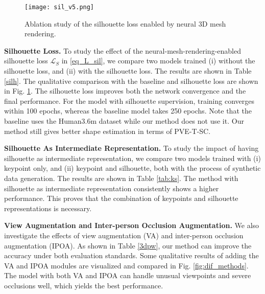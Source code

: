 \documentclass[journal]{IEEEtran}
\begin{document}
\begin{figure}[htbp]
    \centerline{\texttt{[image: sil\_v5.png]}}
    \caption{Ablation study of the silhouette loss enabled by neural 3D mesh rendering.}
    \label{fig:sil}
\end{figure}

\noindent\textbf{Silhouette Loss.} To study the effect of the neural-mesh-rendering-enabled silhouette loss $\mathcal{L}_{S}$ in {\eqref{eq_L_sil}}, we compare two models trained (i) without the silhouette loss, and (ii) with the silhouette loss. The results are shown in Table \ref{silh}. The qualitative comparison with the baseline and silhouette loss are shown in Fig. \ref{fig:sil}. The silhouette loss improves both the network convergence and the final performance. For the model with silhouette supervision, training converges within 100 epochs, whereas the baseline model takes 250 epochs. Note that the baseline uses the Human3.6m dataset while our method does not use it. Our method still gives better shape estimation in terms of PVE-T-SC.

\noindent\textbf{Silhouette As Intermediate Representation.} To study the impact of having silhouette as intermediate representation, we compare two models trained with (i) keypoint only, and (ii) keypoint and silhouette, both with the process of synthetic data generation. The results are shown in Table \ref{tab:ks}. The method with silhouette as intermediate representation consistently shows a higher performance. This proves that the combination of keypoints and silhouette representations is necessary.

\noindent\textbf{View Augmentation and Inter-person Occlusion Augmentation.} We also investigate the effects of view augmentation (VA) and inter-person occlusion augmentation (IPOA). As shown in Table \ref{3dpw}, our method can improve the accuracy under both evaluation standards. Some qualitative results of adding the VA and IPOA modules are visualized and compared in Fig. \ref{fig:dif_methods}. The model with both VA and IPOA can handle unusual viewpoints and severe occlusions well, which yields the best performance.
\end{document}
